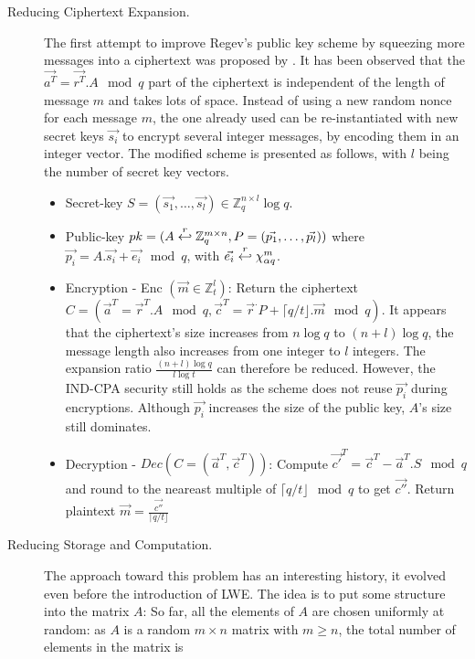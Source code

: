 \begin{description}
\item[Reducing Ciphertext Expansion.] The first attempt to improve Regev's public key scheme by squeezing more messages into a ciphertext was proposed by
  \cite{peikert2008framework} .  It has been observed that the
  $\vec{a^T} = \vec{r^T}. A \mod q$ part of the ciphertext is independent of the length of
  message $m$ and takes lots of space. Instead of using a new random nonce for
  each message $m$, the one already used can be re-instantiated with new secret keys
  $\vec{s_i}$ to encrypt several integer messages, by encoding them in an integer
  vector. The modified scheme is presented as follows, with $l$ being the number
  of secret key vectors.
  \begin{itemize}
  \item Secret-key
    $S = (\vec{s_1}, \dots, \vec{s_l}) \in \mathbb{Z}_q^{n \times l} \log q$.
  \item Public-key
    $pk = (A \stackrel{r}{\hookleftarrow} \mathbb{Z}_q^{m \times n},P=(\vec{p_1}, \dots,
    \vec{p_l}))$ where $\vec{p_i} = A.\vec{s_i} + \vec{e_i} \mod q$, with
    $\vec{e_i} \stackrel{r}{\hookleftarrow} \chi_{\alpha q}^m$.
  \item Encryption - Enc $(\vec{m} \in \mathbb{Z}_t^l)$: Return the ciphertext
    $C = (\vec{a}^T= \vec{r}^T.A \mod q, \vec{c}^T = \vec{r}^.P + \lceil q/t
    \rfloor . \vec{m} \mod q)$. It appears that the ciphertext's size increases from
    $n\log q$ to $(n+l)\log q$, the message length also increases from one
    integer to $l$ integers. The expansion ratio $\frac{(n+l)\log q}{l \log t}$
    can therefore be reduced. However, the IND-CPA security still holds as the scheme
    does not reuse $\vec{p_i}$ during encryptions. Although $\vec{p_i}$ increases the size of
    the public key, $A$'s size still dominates.
  \item Decryption - $Dec(C = (\vec{a}^T, \vec{c}^T))$: Compute
    $\vec{c'}^T = \vec{c}^T - \vec{a}^T.S \mod q$ and round to the neareast
    multiple of $\lceil q/t \rfloor \mod q$ to get $\vec{c''}$. Return plaintext
    $\vec{m} = \frac{\vec{c''}}{\lceil q/t \rfloor}$
  \end{itemize}
\item [Reducing Storage and Computation.] The approach toward this problem has
  an interesting history, it evolved even before the introduction of LWE. The
  idea is to put some structure into the matrix $A$: So far, all the elements of
  $A$ are chosen uniformly at random: as $A$ is a random $m \times n$
  matrix with $m \geq n$, the total number of elements in the matrix is

\end{description}
